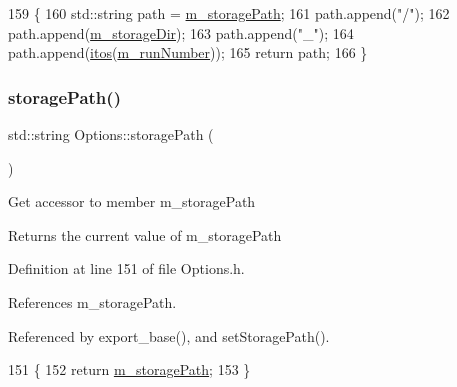 \begin{DoxyCode}
159                                      \{
160                 std::string path = \hyperlink{classOptions_ad125e827cb30bc9b63875ec45b31ef5e}{m\_storagePath};
161                 path.append(\textcolor{stringliteral}{"/"});
162                 path.append(\hyperlink{classOptions_a88d9ed92fceb1c91e4df59bc1f81ab3b}{m\_storageDir});
163                 path.append(\textcolor{stringliteral}{"\_"});
164                 path.append(\hyperlink{Tools_8h_af330027dbdafb9a30768b3613c553e60}{itos}(\hyperlink{classOptions_a1762c644c5f87feabe12f84f17a1a351}{m\_runNumber}));
165                 \textcolor{keywordflow}{return} path;
166         \}
\end{DoxyCode}
\mbox{\label{classOptions_a3992b9247441a3e60e55c8c5fe32b394}} 
\subsubsection{\texorpdfstring{storage\+Path()}{storagePath()}}
{\footnotesize\ttfamily std\+::string Options\+::storage\+Path (\begin{DoxyParamCaption}{ }\end{DoxyParamCaption})\hspace{0.3cm}{\ttfamily [inline]}}

Get accessor to member m\+\_\+storage\+Path \begin{DoxyReturn}{Returns}
the current value of m\+\_\+storage\+Path 
\end{DoxyReturn}


Definition at line 151 of file Options.\+h.



References m\+\_\+storage\+Path.



Referenced by export\+\_\+base(), and set\+Storage\+Path().


\begin{DoxyCode}
151                                  \{
152                 \textcolor{keywordflow}{return} \hyperlink{classOptions_ad125e827cb30bc9b63875ec45b31ef5e}{m\_storagePath};
153         \}
\end{DoxyCode}
\mbox{\label{classOptions_acfc9aa4c7dc41691571f2b37d3fe86af}} 

